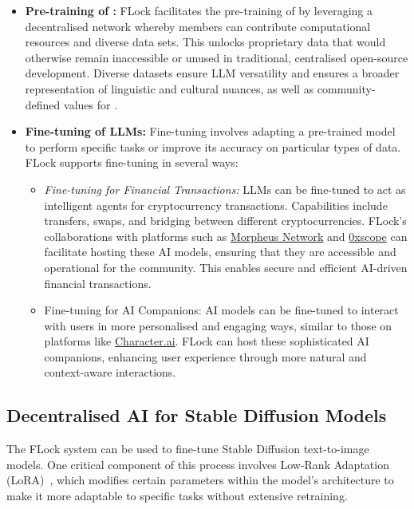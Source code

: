 \documentclass[conference]{IEEEtran}
\begin{document}
\begin{itemize}
    \item \textbf{Pre-training of \LLMs:}
FLock facilitates the pre-training of \LLMs by leveraging a decentralised network whereby members can contribute computational resources and diverse data sets. This unlocks proprietary data that would otherwise remain inaccessible or unused in traditional, centralised open-source development. Diverse datasets ensure LLM versatility and ensures a broader representation of linguistic and cultural nuances, as well as community-defined values for \LLMs.
\item \textbf{Fine-tuning of LLMs:}
Fine-tuning involves adapting a pre-trained model to perform specific tasks or improve its accuracy on particular types of data. FLock supports fine-tuning in several ways:




\begin{itemize}
    \item \emph{Fine-tuning for Financial Transactions:} LLMs can be fine-tuned to act as intelligent agents for cryptocurrency transactions. Capabilities include transfers, swaps, and bridging between different cryptocurrencies. FLock's collaborations with platforms such as \href{https://morpheus.network/}{Morpheus Network} and \href{https://www.0xscope.com/}{0xscope} can facilitate hosting these AI models, ensuring that they are accessible and operational for the community. This enables secure and efficient AI-driven financial transactions.

 \item Fine-tuning for AI Companions: AI models can be fine-tuned to interact with users in more personalised and engaging ways, similar to those on platforms like \href{https://character.ai/}{Character.ai}. FLock can host these sophisticated AI companions, enhancing user experience through more natural and context-aware interactions.
\end{itemize}


\end{itemize}



\subsection{Decentralised AI for Stable Diffusion Models}
The FLock system can be used to fine-tune Stable Diffusion text-to-image models.  One critical component of this process involves Low-Rank Adaptation (LoRA)~\cite{hu2021lora}, which modifies certain parameters within the model's architecture to make it more adaptable to specific tasks without extensive retraining.
\end{document}
